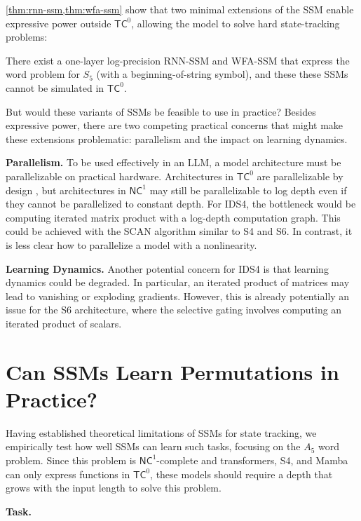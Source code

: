 \ref{thm:rnn-ssm,thm:wfa-ssm} show that two minimal extensions of the SSM enable expressive power outside $\mathsf{TC}^0$, allowing the model to solve hard state-tracking problems:

\begin{corollary}
    There exist a one-layer log-precision RNN-SSM and WFA-SSM that express the word problem for $S_5$ (with a beginning-of-string symbol), and these these SSMs cannot be simulated in $\mathsf{TC}^0$.
\end{corollary}

But would these variants of SSMs be feasible to use in practice? Besides expressive power, there are two competing practical concerns that might make these extensions problematic: parallelism and the impact on learning dynamics.

 \textbf{Parallelism.}
To be used effectively in an LLM, a model architecture must be parallelizable on practical hardware. Architectures in $\mathsf{TC}^0$ are parallelizable by design \citep{merrill-sabharwal-2023-parallelism}, but architectures in $\mathsf{NC}^1$ may still be parallelizable to log depth even if they cannot be parallelized to constant depth. For IDS4, the bottleneck would be computing iterated matrix product with a log-depth computation graph. This could be achieved with the SCAN algorithm \citep{BlellochTR90} similar to S4 and S6. In contrast, it is less clear how to parallelize a model with a nonlinearity.

\textbf{Learning Dynamics.} Another potential concern for IDS4 is that learning dynamics could be degraded. In particular, an iterated product of matrices may lead to vanishing or exploding gradients. However, this is already potentially an issue for the S6 architecture, where the selective gating involves computing an iterated product of scalars.

\section{Can SSMs Learn Permutations in Practice?}

Having established theoretical limitations of SSMs for state tracking, we empirically test how well SSMs can learn such tasks, focusing on the $A_5$ word problem. Since this problem is $\mathsf{NC}^1$-complete and transformers, S4, and Mamba can only express functions in $\mathsf{TC}^0$, these models should require a depth that grows with the input length to solve this problem.

 \textbf{Task.}

